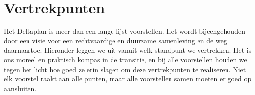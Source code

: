 \chapter{Vertrekpunten}

Het Deltaplan is meer dan een lange lijst voorstellen. Het wordt bijeengehouden door een visie voor een rechtvaardige en duurzame samenleving en de weg daarnaartoe. Hieronder leggen we uit vanuit welk standpunt we vertrekken. Het is ons moreel en praktisch kompas in de transitie, en bij alle voorstellen houden we tegen het licht hoe goed ze erin slagen om deze vertrekpunten te realiseren. Niet elk voorstel raakt aan alle punten, maar alle voorstellen samen moeten er goed op aansluiten.
















